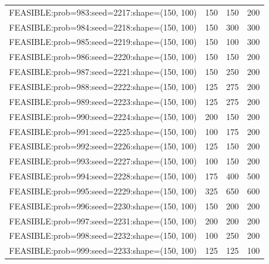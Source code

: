 \begin{longtable}{lccc}
FEASIBLE:prob=983:seed=2217:shape=(150, 100) &      150 &   150 &    200 \\
FEASIBLE:prob=984:seed=2218:shape=(150, 100) &      150 &   300 &    300 \\
FEASIBLE:prob=985:seed=2219:shape=(150, 100) &      150 &   100 &    300 \\
FEASIBLE:prob=986:seed=2220:shape=(150, 100) &      150 &   150 &    200 \\
FEASIBLE:prob=987:seed=2221:shape=(150, 100) &      150 &   250 &    200 \\
FEASIBLE:prob=988:seed=2222:shape=(150, 100) &      125 &   275 &    200 \\
FEASIBLE:prob=989:seed=2223:shape=(150, 100) &      125 &   275 &    200 \\
FEASIBLE:prob=990:seed=2224:shape=(150, 100) &      200 &   150 &    200 \\
FEASIBLE:prob=991:seed=2225:shape=(150, 100) &      100 &   175 &    200 \\
FEASIBLE:prob=992:seed=2226:shape=(150, 100) &      125 &   150 &    200 \\
FEASIBLE:prob=993:seed=2227:shape=(150, 100) &      100 &   150 &    200 \\
FEASIBLE:prob=994:seed=2228:shape=(150, 100) &      175 &   400 &    500 \\
FEASIBLE:prob=995:seed=2229:shape=(150, 100) &      325 &   650 &    600 \\
FEASIBLE:prob=996:seed=2230:shape=(150, 100) &      150 &   200 &    200 \\
FEASIBLE:prob=997:seed=2231:shape=(150, 100) &      200 &   200 &    200 \\
FEASIBLE:prob=998:seed=2232:shape=(150, 100) &      100 &   250 &    200 \\
FEASIBLE:prob=999:seed=2233:shape=(150, 100) &      125 &   125 &    100 \\
\end{longtable}

